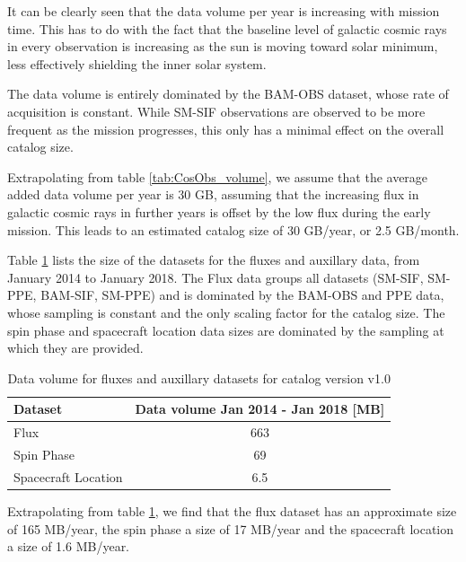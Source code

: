 \documentclass[a4paper, 11pt]{article}
\newcommand{\dmVersion}{v1.0}
\begin{document}
It can be clearly seen that the data volume per year is increasing with mission time. This has to do with the fact that the baseline level of galactic cosmic rays in every observation is increasing as the sun is moving toward solar minimum, less effectively shielding the inner solar system.

The data volume is entirely dominated by the BAM-OBS dataset, whose rate of acquisition is constant. While SM-SIF observations are observed to be more frequent as the mission progresses, this only has a minimal effect on the overall catalog size.

Extrapolating from table \ref{tab:CosObs_volume}, we assume that the average added data volume per year is 30 GB, assuming that the increasing flux in galactic cosmic rays in further years is offset by the low flux during the early mission. This leads to an estimated catalog size of 30 GB/year, or 2.5 GB/month.


Table \ref{tab:AuxDat_volume} lists the size of the datasets for the fluxes and auxillary data, from January 2014 to January 2018. The Flux data groups all datasets (SM-SIF, SM-PPE, BAM-SIF, SM-PPE) and is dominated by the BAM-OBS and PPE data, whose sampling is constant and the only scaling factor for the catalog size. The spin phase and spacecraft location data sizes are dominated by the sampling at which they are provided.

\begin{table}[!h]
\centering
{\begin{tabular}{|l|c|}
\hline
{Dataset} & {Data volume Jan 2014 - Jan 2018 [MB]} \\ \hline
Flux & 663 \\ \hline
Spin Phase & 69 \\ \hline
Spacecraft Location & 6.5 \\ \hline
\end{tabular}}
\caption{Data volume for fluxes and auxillary datasets for catalog version \dmVersion}
\label{tab:AuxDat_volume}
\end{table}

Extrapolating from table \ref{tab:AuxDat_volume}, we find that the flux dataset has an approximate size of 165 MB/year, the spin phase a size of 17 MB/year and the spacecraft location a size of 1.6 MB/year.
\end{document}
